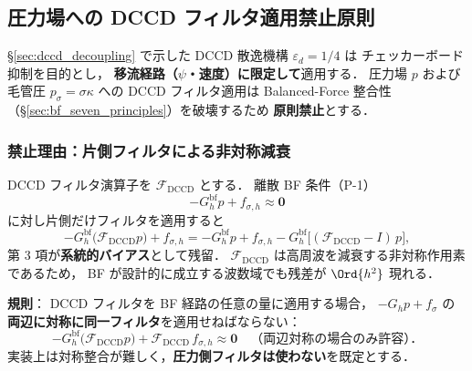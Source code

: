 %
%
\subsection{圧力場への DCCD フィルタ適用禁止原則}
\label{sec:dccd_pressure_filter_prohibition}

§\ref{sec:dccd_decoupling} で示した DCCD 散逸機構 $\varepsilon_d = 1/4$ は
チェッカーボード抑制を目的とし，
\textbf{移流経路（$\psi$・速度）に限定して}適用する．
圧力場 $p$ および毛管圧 $p_\sigma = \sigma\kappa$ への DCCD フィルタ適用は
Balanced-Force 整合性（§\ref{sec:bf_seven_principles}）を破壊するため
\textbf{原則禁止}とする．

\subsubsection{禁止理由：片側フィルタによる非対称減衰}
\label{sec:dccd_pressure_filter_asymmetric}

DCCD フィルタ演算子を $\mathcal{F}_\text{DCCD}$ とする．
離散 BF 条件（P-1）
\begin{equation}
  -G_h^\text{bf} p + f_{\sigma,h} \approx \mathbf{0}
  \label{eq:dccd_filter_bf_target}
\end{equation}
に対し片側だけフィルタを適用すると
\begin{equation}
  -G_h^\text{bf}\bigl(\mathcal{F}_\text{DCCD} p\bigr) + f_{\sigma,h}
    = -G_h^\text{bf} p + f_{\sigma,h} - G_h^\text{bf}\bigl[(\mathcal{F}_\text{DCCD}-I)\,p\bigr],
  \label{eq:dccd_filter_bias}
\end{equation}
第 3 項が\textbf{系統的バイアス}として残留．
$\mathcal{F}_\text{DCCD}$ は高周波を減衰する非対称作用素であるため，
BF が設計的に成立する波数域でも残差が $\Ord{h^2}$ 現れる．

\noindent\textbf{規則}：
DCCD フィルタを BF 経路の任意の量に適用する場合，
$-G_h p + f_\sigma$ の\textbf{両辺に対称に同一フィルタ}を適用せねばならない：
\begin{equation}
  -G_h^\text{bf}\bigl(\mathcal{F}_\text{DCCD} p\bigr)
  + \mathcal{F}_\text{DCCD}\,f_{\sigma,h} \approx \mathbf{0}
  \quad\text{（両辺対称の場合のみ許容）．}
  \label{eq:dccd_filter_symmetric_allowed}
\end{equation}
実装上は対称整合が難しく，\textbf{圧力側フィルタは使わない}を既定とする．

